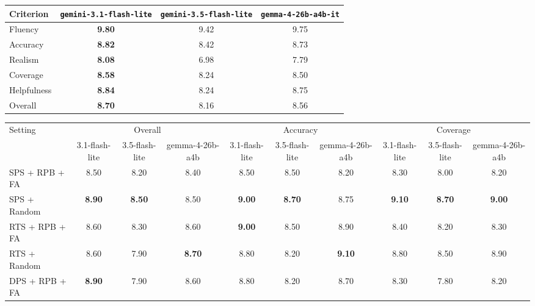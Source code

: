 \begin{tabular}{lccc}
\toprule
Criterion & \texttt{gemini-3.1-flash-lite} & \texttt{gemini-3.5-flash-lite} & \texttt{gemma-4-26b-a4b-it} \\
\midrule
Fluency & \textbf{9.80} & 9.42 & 9.75 \\
Accuracy & \textbf{8.82} & 8.42 & 8.73 \\
Realism & \textbf{8.08} & 6.98 & 7.79 \\
Coverage & \textbf{8.58} & 8.24 & 8.50 \\
Helpfulness & \textbf{8.84} & 8.24 & 8.75 \\
Overall & \textbf{8.70} & 8.16 & 8.56 \\
\bottomrule
\end{tabular}

\begin{tabular}{lccccccccc}
\toprule
Setting & \multicolumn{3}{c}{Overall} & \multicolumn{3}{c}{Accuracy} & \multicolumn{3}{c}{Coverage} \\
\cmidrule(lr){2-4} \cmidrule(lr){5-7} \cmidrule(lr){8-10}
 & 3.1-flash-lite & 3.5-flash-lite & gemma-4-26b-a4b & 3.1-flash-lite & 3.5-flash-lite & gemma-4-26b-a4b & 3.1-flash-lite & 3.5-flash-lite & gemma-4-26b-a4b \\
\midrule
SPS + RPB + FA & 8.50 & 8.20 & 8.40 & 8.50 & 8.50 & 8.20 & 8.30 & 8.00 & 8.20 \\
SPS + Random & \textbf{8.90} & \textbf{8.50} & 8.50 & \textbf{9.00} & \textbf{8.70} & 8.75 & \textbf{9.10} & \textbf{8.70} & \textbf{9.00} \\
RTS + RPB + FA & 8.60 & 8.30 & 8.60 & \textbf{9.00} & 8.50 & 8.90 & 8.40 & 8.20 & 8.30 \\
RTS + Random & 8.60 & 7.90 & \textbf{8.70} & 8.80 & 8.20 & \textbf{9.10} & 8.80 & 8.50 & 8.90 \\
DPS + RPB + FA & \textbf{8.90} & 7.90 & 8.60 & 8.80 & 8.20 & 8.70 & 8.30 & 7.80 & 8.20 \\
\bottomrule
\end{tabular}
